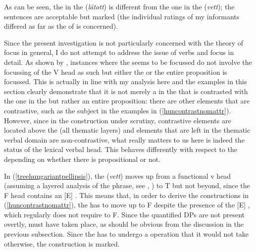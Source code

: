 \ea \label{huncontrastnomattr}
\z
\z

As can be seen, the  in the  (\textit{látott}) is different from the one in the  (\textit{vett}); the sentences are acceptable but marked (the individual ratings of my informants differed as far as the  of  is concerned).

Since the present investigation is not particularly concerned with the theory of focus in general, I do not attempt to address the issue of verbs and focus in detail. As shown by \citet{kenesei2006}, instances where the  seems to be focussed do not involve the focussing of the V head as such but either the  or the entire proposition is focussed. This is actually in line with my analysis here and the examples in this section clearly demonstrate that it is not merely a  in the  that is contrasted with the one in the  but rather an entire proposition: there are other elements that are contrastive, such as the subject  in the examples in (\ref{huncontrastnomattr}). However, since in the construction under scrutiny, contrastive elements are located above the  (all thematic  layers) and elements that are left in the thematic verbal domain are non-contrastive, what really matters to us here is indeed the status of the lexical verbal head. This behaves differently with respect to the  depending on whether there is propositional  or not.

\largerpage[1]
In (\ref{treehungariantpellipsis}), the  (\textit{vett}) moves up from a functional v head (assuming a layered analysis of the   phrase, see \citealt{ekiss2008}, \citealt{ekiss2009}) to T but not beyond, since the F head contains an [E] . This means that, in order to derive the constructions in (\ref{huncontrastnomattr}), the  has to move up to F despite the presence of the [E] , which regularly does not require  to F. Since the quantified DPs are not present overtly,  must have taken place, as should be obvious from the discussion in the previous subsection. Since the  has to undergo a  operation that it would not take otherwise, the construction is marked.


